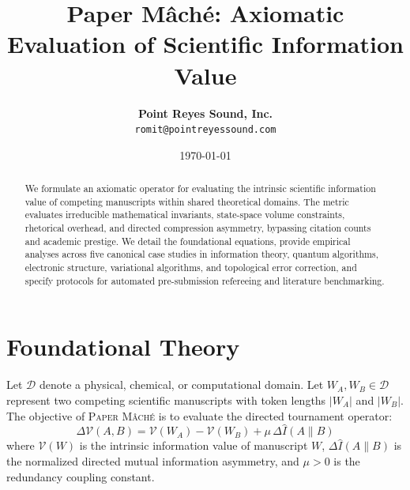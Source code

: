 \documentclass[twocolumn,10pt,letterpaper]{article}
\title{\textbf{\LARGE Paper M\^ach\'e: Axiomatic Evaluation of Scientific Information Value}}
\author{\textbf{Point Reyes Sound, Inc.} \\
\texttt{romit@pointreyessound.com}}
\date{\today}
\begin{document}
\maketitle

\begin{abstract}
We formulate an axiomatic operator for evaluating the intrinsic scientific information value of competing manuscripts within shared theoretical domains. The metric evaluates irreducible mathematical invariants, state-space volume constraints, rhetorical overhead, and directed compression asymmetry, bypassing citation counts and academic prestige. We detail the foundational equations, provide empirical analyses across five canonical case studies in information theory, quantum algorithms, electronic structure, variational algorithms, and topological error correction, and specify protocols for automated pre-submission refereeing and literature benchmarking.
\end{abstract}

\section{Foundational Theory}

Let $\mathcal{D}$ denote a physical, chemical, or computational domain. Let $W_A, W_B \in \mathcal{D}$ represent two competing scientific manuscripts with token lengths $|W_A|$ and $|W_B|$. The objective of \textsc{Paper M\^ach\'e} is to evaluate the directed tournament operator:
\begin{equation}
\Delta \mathcal{V}(A, B) = \mathcal{V}(W_A) - \mathcal{V}(W_B) + \mu \, \Delta \hat{I}(A \parallel B)
\end{equation}
where $\mathcal{V}(W)$ is the intrinsic information value of manuscript $W$, $\Delta \hat{I}(A \parallel B)$ is the normalized directed mutual information asymmetry, and $\mu > 0$ is the redundancy coupling constant.
\end{document}
